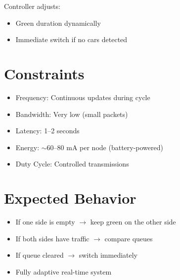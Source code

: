 \documentclass[11pt]{article}
\begin{document}
Controller adjusts:
\begin{itemize}
    \item Green duration dynamically
    \item Immediate switch if no cars detected
\end{itemize}

\section{Constraints}

\begin{itemize}
    \item Frequency: Continuous updates during cycle
    \item Bandwidth: Very low (small packets)
    \item Latency: 1--2 seconds
    \item Energy: $\sim$60--80 mA per node (battery-powered)
    \item Duty Cycle: Controlled transmissions
\end{itemize}

\section{Expected Behavior}

\begin{itemize}
    \item If one side is empty $\rightarrow$ keep green on the other side
    \item If both sides have traffic $\rightarrow$ compare queues
    \item If queue cleared $\rightarrow$ switch immediately
    \item Fully adaptive real-time system
\end{itemize}
\end{document}
